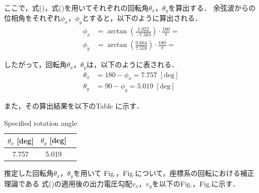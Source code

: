 ここで，式()，式()を用いてそれぞれの回転角$\theta_x$，$\theta_y$を算出する．
余弦波からの位相角をそれぞれ$\phi_x$，$\phi_y$とすると，以下のように算出される．
\begin{align}
	\phi_x &= \arctan \left(\frac{1.022}{-7.503}\right) \cdot \frac{180}{\pi} = \\
	\phi_y &= \arctan \left(\frac{0.664}{7.559}\right) \cdot \frac{180}{\pi} = 
\end{align}

したがって，回転角$\theta_x$，$\theta_y$は，以下のように表される．
\begin{align}
	\theta_x &= 180 - \phi_x = 7.757 \; [\mathrm{deg}]\\
	\theta_y &= 90 - \phi_y = 5.019 \; [\mathrm{deg}]
\end{align}

また，その算出結果を以下のTable に示す．

\begin{table}[htbp]
  \begin{center}
      \caption{Specified rotation angle}
      \begin{tabular}{|p{30mm}|p{20mm}|p{20mm}|}
          \hline
          \multicolumn{1}{|c|}{$\theta_x$ [deg]} & \multicolumn{1}{|c|}{$\theta_y$ [deg]} \\ \hline
          \multicolumn{1}{|c|}{7.757}           & \multicolumn{1}{|c|}{5.019}           \\ \hline
      \end{tabular}
  \end{center}
\end{table}

\newpage
推定した回転角$\theta_x$，$\theta_y$を用いて
Fig.，Fig.について，座標系の回転における補正理論である
式()の適用後の出力電圧勾配$v_x$，$v_y$を以下のFig.，Fig.に示す．

